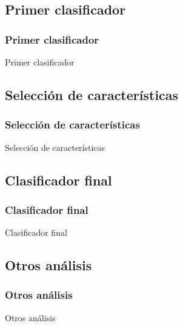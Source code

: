 \subsection{Primer clasificador}
\begin{frame}
    \frametitle{Primer clasificador}

    Primer clasificador
\end{frame}

\subsection{Selección de características}
\begin{frame}
    \frametitle{Selección de características}

    Selección de características
\end{frame}

\subsection{Clasificador final}
\begin{frame}
    \frametitle{Clasificador final}

    Clasificador final
\end{frame}

\subsection{Otros análisis}
\begin{frame}
    \frametitle{Otros análisis}

    Otros análisis
\end{frame}
